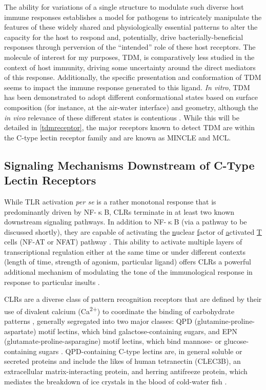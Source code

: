 The ability for variations of a single structure to modulate such diverse host immune responses establishes a model for pathogens to intricately manipulate the features of these widely shared and physiologically essential patterns to alter the capacity for the host to respond and, potentially, drive bacterially\hyp{}beneficial responses through perversion of the ``intended'' role of these host receptors. The molecule of interest for my purposes, TDM, is comparatively less studied in the context of host immunity, driving some uncertainty around the direct mediators of this response. Additionally, the specific presentation and conformation of TDM seems to impact the immune response generated to this ligand. \textit{In vitro}, TDM has been demonstrated to adopt different conformational states based on surface composition (for instance, at the air\hyp{}water interface) and geometry, although the \textit{in vivo} relevance of these different states is contentious \citep{Hunter2006b, Behling1993}. While this will be detailed in \autoref{tdmreceptor}, the major receptors known to detect TDM are within the C\hyp{}type lectin receptor family and are known as MINCLE and MCL.

\subsection{Signaling Mechanisms Downstream of C\hyp{}Type Lectin Receptors}\label{clrsig}

While TLR activation \textit{per se} is a rather monotonal response that is predominantly driven by NF\hyp{}$\upkappa$B, CLRs terminate in at least two known downstream signaling pathways. In addition to NF\hyp{}$\upkappa$B (via a pathway to be discussed shortly), they are capable of activating the \underline{n}uclear \underline{f}actor of \underline{a}ctivated \underline{T} cells (NF\hyp{}AT or NFAT) pathway \citep{Goodridge2007, Dambuza2015}. This ability to activate multiple layers of transcriptional regulation either at the same time or under different contexts (length of time, strength of agonism, particular ligand) offers CLRs a powerful additional mechanism of modulating the tone of the immunological response in response to particular insults \citep{Brown2018}. 

CLRs are a diverse class of pattern recognition receptors that are defined by their use of divalent calcium (Ca\textsuperscript{2+}) to coordinate the binding of carbohydrate patterns \citep{Hosoi1998, Dodd2001}, generally segregated into two major classes: QPD (glutamine\hyp{}proline\hyp{}aspartate) motif lectins, which bind galactose\hyp{}containing sugars, and EPN (glutamate\hyp{}proline\hyp{}asparagine) motif lectins, which bind mannose\hyp{} or glucose\hyp{}containing sugars \citep{Furukawa2013, Alenton2017, Zelensky2005, Holtet1997}. QPD\hyp{}containing C\hyp{}type lectins are, in general soluble or secreted proteins and include the likes of human tetranectin (CLEC3B), an extracellular matrix\hyp{}interacting protein, and herring antifreeze protein, which mediates the breakdown of ice crystals in the blood of cold\hyp{}water fish \citep{Liu2007, Ewart1998, Ewart1993, Graversen1998, Nielsen1997}. 

